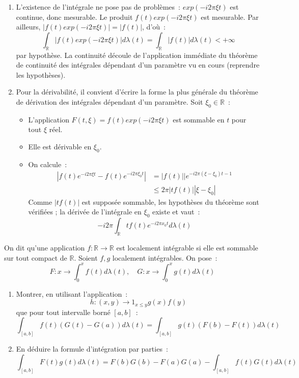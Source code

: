 \documentclass[a4paper, 12pt]{amsart}
\begin{document}
\begin{enumerate}
\item L'existence de l'intégrale ne pose pas de problèmes~: $exp(-i 2 \pi \xi
t)$ est continue, donc mesurable. 
Le produit $f(t) exp(-i 2 \pi \xi t)$ est mesurable. Par ailleurs, $|f(t) exp(-i
2 \pi \xi t)| = |f(t)|$, d'où~:
\[
\int_{\mathbb{R}} |f(t) exp(-i 2 \pi \xi t)| d\lambda(t) = \int_{\mathbb{R}}
|f(t)| d \lambda(t) < +\infty
\]
par hypothèse.
La continuité découle de l'application immédiate du théorème de continuité des
intégrales dépendant d'un paramètre
vu en cours (reprendre les hypothèses).
\item Pour la dérivabilité, il convient d'écrire la forme la plus générale du
théorème de dérivation des intégrales dépendant d'un paramètre. Soit $\xi_0 \in
\mathbb{R}$~:
\begin{itemize}
\item L'application $F(t,\xi) = f(t) exp(-i 2 \pi \xi t)$ est sommable en $t$
pour tout $\xi$ réel.
\item Elle est dérivable en $\xi_0$.
\item On calcule~:
\begin{align*}
| f(t) e^{-i 2 \pi \xi t} - f(t) e^{- i 2 \pi \xi_0 t}| &= |f(t)||e^{-i 2 \pi
(\xi - \xi_0)t -1} \\
& \leq 2 \pi |t f(t)| |\xi - \xi_0|
\end{align*}
Comme $|t f(t)|$ est supposée sommable, les hypothèses du théorème sont
vérifiées ; la dérivée de 
l'intégrale en $\xi_0$ existe et vaut~:
\[
- i 2 \pi \int_{\mathbb{R}} t f(t) e^{-i 2 \pi x_0 t} d \lambda(t)
\]
\end{itemize}
\end{enumerate}
\begin{fex}
 On dit qu'une application $f : \mathbb{R} \to \mathbb{R}$ est
localement intégrable si elle est sommable sur tout compact de
$\mathbb{R}$. Soient $f,g$ localement intégrables. On pose~:
\[
F : x \to \int_0^x f(t) d \lambda(t) , \quad G : x \to \int_0^x g(t) d
\lambda(t)
\]
\begin{enumerate}
\item Montrer, en utilisant l'application~:
\[
h : (x,y) \to 1_{x \leq y} g(x) f(y)
\]
que pour tout intervalle borné $[a,b]$~:
\[
\int_{[a,b]} f(t)(G(t) - G(a)) d\lambda(t) =
\int_{[a,b]}g(t)(F(b)-F(t)) d\lambda(t)
\]
\item En déduire la formule d'intégration par parties~:
\[
\int_{[a,b]} F(t) g(t) d \lambda(t) = F(b)G(b)-F(a)G(a) - \int_{[a,b]}
f(t) G(t) d \lambda(t)
\]
\end{enumerate}
\end{fex}
\end{document}

